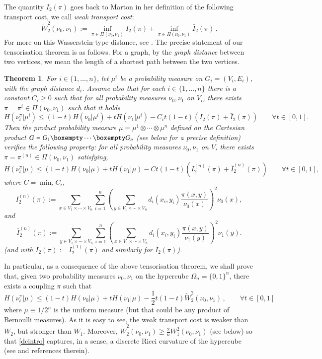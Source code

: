 \documentclass[11pt]{amsart}
\newtheorem{thm}[equation]{Theorem}
\numberwithin{equation}{section}
\begin{document}
The quantity $I_2(\pi)$ goes back to Marton \cite{marton96,marton97}
in her definition of the following transport cost, we call \emph{weak transport cost}:
$$
\widetilde W_2^2(\nu_0,\nu_1) := \inf_{\pi \in \Pi(\nu_0,\nu_1)}  I_2(\pi) + \inf_{\pi \in \Pi(\nu_0,\nu_1)}  \bar{I}_2(\pi)\,.
$$
For more on this Wasserstein-type distance, see \cite{dembo97, marton99, S00}.  The precise statement of our tensorisation theorem is as follows. For  a graph, by the {\em graph distance} between two vertices, we mean the length of a shortest path between the two vertices.

\begin{thm} \label{th:mainintro}
For $i\in \{1,\ldots,n\}$, let $\mu^i$ be a probability measure on  $G_i=(V_i, E_i)$, with the graph distance $d_i$.  Assume also that for each $i\in \{1,\ldots,n\}$ there is a constant $C_i\geq 0$ such that for all probability measures $\nu_0,\nu_1$ on $V_i$, there exists $\pi = \pi^i \in \Pi(\nu_0,\nu_1)$ such that  it holds
$$
H(\nu_t^\pi | \mu^i) \leq (1-t)H(\nu_0 | \mu^{i}) + tH(\nu_1 | \mu^{i}) - C_it(1-t)(I_2(\pi)+\bar{I}_2(\pi)) \qquad \forall t\in [0,1].
$$
Then the product probability measure $\mu=\mu^1\otimes\cdots\otimes\mu^n$ defined on the Cartesian product $G=G_1\boxempty\cdots\boxempty G_n$ (see below for a precise definition) verifies the following property: 
for all probability measures $\nu_0,\nu_1$ on $V$, there exists $\pi = \pi^{(n)}\in \Pi(\nu_0,\nu_1)$ satisfying,
$$
H(\nu_t^\pi | \mu) \leq (1-t)H(\nu_0 | \mu) + tH(\nu_1 | \mu) - Ct(1-t)(I_2^{(n)}(\pi)+\bar{I}^{(n)}_2(\pi))
\qquad \forall t\in [0,1] ,
$$
where $C=\min_i C_i$,
$$
I_2^{(n)}(\pi) := \sum_{x \in V_1 \times \cdots \times V_{n}} \sum_{i=1}^n  \left( \sum_{y \in V_1 \times\cdots \times V_{n}} d_i(x_i,y_i) \frac{\pi(x,y)}{\nu_0(x)} \right)^2 \nu_0(x) ,
$$
and
$$
\bar I_2^{(n)}(\pi) := \sum_{y \in V_1 \times \cdots \times V_{n}} \sum_{i=1}^n  \left( \sum_{x \in V_1 \times\cdots \times V_{n}} d_i(x_i,y_i) \frac{\pi(x,y)}{\nu_1(y)} \right)^2 \nu_1(y) .
$$
(and with $I_2(\pi):=I_2^{(1)}(\pi)$ and similarly for $\bar I_2(\pi)$).
\end{thm}

In particular, as a consequence of the above tensorisation theorem, we shall prove that, given two probability measures $\nu_0, \nu_1$ on the hypercube $\Omega_n=\{0,1\}^n$, there exists a coupling $\pi$ such that
\begin{equation} \label{dcintro}
H(\nu_t^\pi|\mu) \leq (1-t) H(\nu_0|\mu) + t H(\nu_1|\mu) - \frac{1}{2}t(1-t) \widetilde W_2^2(\nu_0,\nu_1) \,,
\qquad \forall t\in[0,1] 
\end{equation}
where $\mu \equiv 1/2^n$ is the uniform measure (but that could be any product of Bernoulli measures).
As it is easy to see, the weak transport cost is weaker than $W_2$, but stronger than $W_1$. Moreover,
$\widetilde W_2^2(\nu_0,\nu_1) \geq \frac{2}{n} W_1^2(\nu_0,\nu_1)$ (see below) so that \eqref{dcintro} captures, in a sense, a discrete Ricci curvature of the hypercube (see \cite{ollivier-villani} and references therein).
\end{document}
